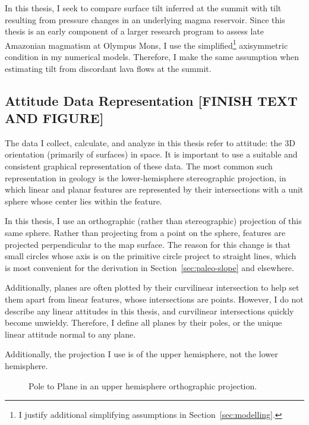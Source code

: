 In this thesis, I seek to compare surface tilt inferred at the summit with tilt resulting from pressure changes in an underlying magma reservoir. Since this thesis is an early component of a larger research program to assess late Amazonian magmatism at Olympus Mons, I use the simplified\footnote{I justify additional simplifying assumptions in Section~\ref{sec:modelling}.} axisymmetric condition in my numerical models. Therefore, I make the same assumption when estimating tilt from discordant lava flows at the summit.

\subsection{Attitude Data Representation [FINISH TEXT AND FIGURE]}

The data I collect, calculate, and analyze in this thesis refer to attitude: the 3D orientation (primarily of surfaces) in space. It is important to use a suitable and consistent graphical representation of these data. The most common such representation in geology is the lower-hemisphere stereographic projection, in which linear and planar features are represented by their intersections with a unit sphere whose center lies within the feature.

In this thesis, I use an orthographic (rather than stereographic) projection of this same sphere. Rather than projecting from a point on the sphere, features are projected perpendicular to the map surface. The reason for this change is that small circles whose axis is on the primitive circle project to straight lines, which is most convenient for the derivation in Section~\ref{sec:paleo-slope} and elsewhere.

Additionally, planes are often plotted by their curvilinear intersection to help set them apart from linear features, whose intersections are points. However, I do not describe any linear attitudes in this thesis, and curvilinear intersections quickly become unwieldy. Therefore, I define all planes by their poles, or the unique linear attitude normal to any plane.

Additionally, the projection I use is of the upper hemisphere, not the lower hemisphere.

\begin{figure}
    \caption[Pole to plane]{Pole to Plane in an upper hemisphere orthographic projection.}%
    \label{fig:surface}%
\end{figure}


